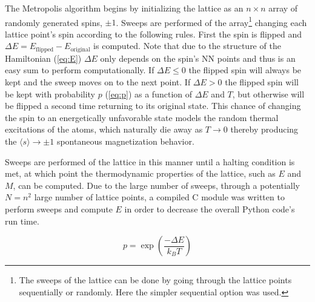 \documentclass[notitlepage,aps,prd,nofootinbib]{revtex4-1}
\begin{document}
The Metropolis algorithm begins by initializing the lattice as an $n\times n$ array of randomly generated spins, $\pm 1$. Sweeps are performed of the array\footnote{The sweeps of the lattice can be done by going through the lattice points sequentially or randomly. Here the simpler sequential option was used.} changing each lattice point's spin according to the following rules. First the spin is flipped and $\Delta E = E_{\mathrm{flipped}} - E_{\mathrm{original}}$ is computed. Note that due to the structure of the Hamiltonian (\ref{eq:E}) $\Delta E$ only depends on the spin's NN points and thus is an easy sum to perform computationally. If $\Delta E \leq 0$ the flipped spin will always be kept and the sweep moves on to the next point. If $\Delta E > 0$ the flipped spin will be kept with probability $p$ (\ref{eq:p}) as a function of $\Delta E$ and $T$, but otherwise will be flipped a second time returning to its original state. This chance of changing the spin to an energetically unfavorable state models the random thermal excitations of the atoms, which naturally die away as $T\rightarrow0$ thereby producing the $\langle s \rangle \rightarrow \pm 1$ spontaneous magnetization behavior.

Sweeps are performed of the lattice in this manner until a halting condition is met, at which point the thermodynamic properties of the lattice, such as $E$ and $M$, can be computed. Due to the large number of sweeps, through a potentially $N=n^2$ large number of lattice points, a compiled C module was written to perform sweeps and compute $E$ in order to decrease the overall Python code's run time.




\begin{equation}
\label{eq:p}
p = \exp\left(\frac{-\Delta E}{k_{B} T}\right)
\end{equation}
\end{document}
